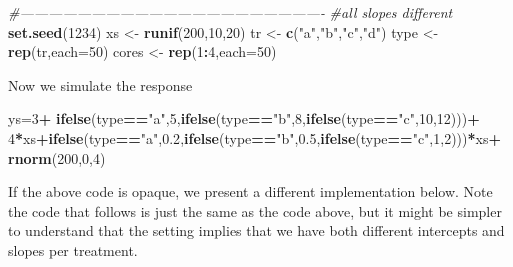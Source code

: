 \documentclass[
]{book}
\newenvironment{Shaded}{\begin{snugshade}}{\end{snugshade}}
\newcommand{\CommentTok}[1]{\textcolor[rgb]{0.56,0.35,0.01}{\textit{#1}}}
\newcommand{\DataTypeTok}[1]{\textcolor[rgb]{0.13,0.29,0.53}{#1}}
\newcommand{\DecValTok}[1]{\textcolor[rgb]{0.00,0.00,0.81}{#1}}
\newcommand{\FloatTok}[1]{\textcolor[rgb]{0.00,0.00,0.81}{#1}}
\newcommand{\KeywordTok}[1]{\textcolor[rgb]{0.13,0.29,0.53}{\textbf{#1}}}
\newcommand{\NormalTok}[1]{#1}
\newcommand{\OperatorTok}[1]{\textcolor[rgb]{0.81,0.36,0.00}{\textbf{#1}}}
\newcommand{\StringTok}[1]{\textcolor[rgb]{0.31,0.60,0.02}{#1}}
\begin{document}
\begin{Shaded}
\begin{Highlighting}[]
\CommentTok{#----------------------------------------------------------------}
\CommentTok{#all slopes different}
\KeywordTok{set.seed}\NormalTok{(}\DecValTok{1234}\NormalTok{)}
\NormalTok{xs <-}\StringTok{ }\KeywordTok{runif}\NormalTok{(}\DecValTok{200}\NormalTok{,}\DecValTok{10}\NormalTok{,}\DecValTok{20}\NormalTok{)}
\NormalTok{tr <-}\StringTok{ }\KeywordTok{c}\NormalTok{(}\StringTok{"a"}\NormalTok{,}\StringTok{"b"}\NormalTok{,}\StringTok{"c"}\NormalTok{,}\StringTok{"d"}\NormalTok{)}
\NormalTok{type <-}\StringTok{ }\KeywordTok{rep}\NormalTok{(tr,}\DataTypeTok{each=}\DecValTok{50}\NormalTok{)}
\NormalTok{cores <-}\StringTok{ }\KeywordTok{rep}\NormalTok{(}\DecValTok{1}\OperatorTok{:}\DecValTok{4}\NormalTok{,}\DataTypeTok{each=}\DecValTok{50}\NormalTok{)}
\end{Highlighting}
\end{Shaded}

Now we simulate the response

\begin{Shaded}
\begin{Highlighting}[]
\NormalTok{ys=}\DecValTok{3}\OperatorTok{+}
\KeywordTok{ifelse}\NormalTok{(type}\OperatorTok{==}\StringTok{"a"}\NormalTok{,}\DecValTok{5}\NormalTok{,}\KeywordTok{ifelse}\NormalTok{(type}\OperatorTok{==}\StringTok{"b"}\NormalTok{,}\DecValTok{8}\NormalTok{,}\KeywordTok{ifelse}\NormalTok{(type}\OperatorTok{==}\StringTok{"c"}\NormalTok{,}\DecValTok{10}\NormalTok{,}\DecValTok{12}\NormalTok{)))}\OperatorTok{+}
\DecValTok{4}\OperatorTok{*}\NormalTok{xs}\OperatorTok{+}\KeywordTok{ifelse}\NormalTok{(type}\OperatorTok{==}\StringTok{"a"}\NormalTok{,}\FloatTok{0.2}\NormalTok{,}\KeywordTok{ifelse}\NormalTok{(type}\OperatorTok{==}\StringTok{"b"}\NormalTok{,}\FloatTok{0.5}\NormalTok{,}\KeywordTok{ifelse}\NormalTok{(type}\OperatorTok{==}\StringTok{"c"}\NormalTok{,}\DecValTok{1}\NormalTok{,}\DecValTok{2}\NormalTok{)))}\OperatorTok{*}\NormalTok{xs}\OperatorTok{+}
\KeywordTok{rnorm}\NormalTok{(}\DecValTok{200}\NormalTok{,}\DecValTok{0}\NormalTok{,}\DecValTok{4}\NormalTok{)}
\end{Highlighting}
\end{Shaded}

If the above code is opaque, we present a different implementation below. Note the code that follows is just the same as the code above, but it might be simpler to understand that the setting implies that we have both different intercepts and slopes per treatment.
\end{document}
